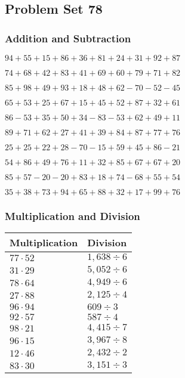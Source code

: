 \hypertarget{problem-set-78}{%
\subsection{Problem Set 78}\label{problem-set-78}}

\hypertarget{addition-and-subtraction}{%
\subsubsection{Addition and
Subtraction}\label{addition-and-subtraction}}

\(94+55+15+86+36+81+24+31+92+87\)

\(74+68+42+83+41+69+60+79+71+82\)

\(85+98+49+93+18+48+62-70-52-45\)

\(65+53+25+67+15+45+52+87+32+61\)

\(86-53+35+50+34-83-53+62+49+11\)

\(89+71+62+27+41+39+84+87+77+76\)

\(25+25+22+28-70-15+59+45+86-21\)

\(54+86+49+76+11+32+85+67+67+20\)

\(85+57-20-20+83+18+74-68+55+54\)

\(35+38+73+94+65+88+32+17+99+76\)

\hypertarget{multiplication-and-division}{%
\subsubsection{Multiplication and
Division}\label{multiplication-and-division}}

\begin{longtable}[]{@{}ll@{}}
\toprule
Multiplication & Division\tabularnewline
\midrule
\endhead
\(77\cdot52\) & \(1,638÷6\)\tabularnewline
\(31\cdot29\) & \(5,052÷6\)\tabularnewline
\(78\cdot64\) & \(4,949÷6\)\tabularnewline
\(27\cdot88\) & \(2,125÷4\)\tabularnewline
\(96\cdot94\) & \(609÷3\)\tabularnewline
\(92\cdot57\) & \(587÷4\)\tabularnewline
\(98\cdot21\) & \(4,415÷7\)\tabularnewline
\(96\cdot15\) & \(3,967÷8\)\tabularnewline
\(12\cdot46\) & \(2,432÷2\)\tabularnewline
\(83\cdot30\) & \(3,151÷3\)\tabularnewline
\bottomrule
\end{longtable}
